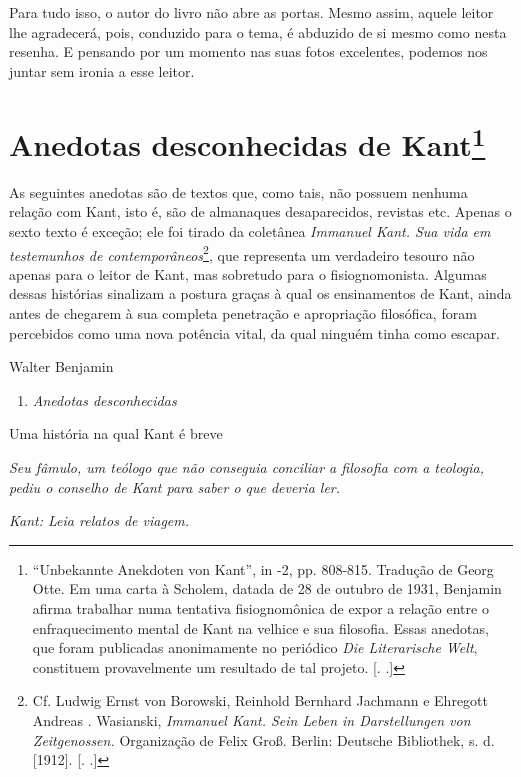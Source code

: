Para tudo isso, o autor do livro não abre as portas. Mesmo assim, aquele
leitor lhe agradecerá, pois, conduzido para o tema, é abduzido de si
mesmo como nesta resenha. E pensando por um momento nas suas fotos
excelentes, podemos nos juntar sem ironia a esse leitor.

\chapter{Anedotas desconhecidas de Kant\footnote[*]{``Unbekannte Anekdoten von
  Kant'', in  -2, pp. 808-815. Tradução de Georg Otte. Em uma carta
  à Scholem, datada de 28 de outubro de 1931, Benjamin afirma trabalhar
  numa tentativa fisiognomônica de expor a relação entre o
  enfraquecimento mental de Kant na velhice e sua filosofia. Essas
  anedotas, que foram publicadas anonimamente no periódico \emph{Die
  Literarische Welt}, constituem provavelmente um resultado de tal
  projeto. [. .]}}

As seguintes anedotas são de textos que, como tais, não possuem nenhuma
relação com Kant, isto é, são de almanaques desaparecidos, revistas etc.
Apenas o sexto texto é exceção; ele foi tirado da coletânea
\emph{Immanuel Kant. Sua vida em testemunhos de
contemporâneos}\footnote{Cf. Ludwig Ernst von Borowski, Reinhold
  Bernhard Jachmann e Ehregott Andreas . Wasianski, \emph{Immanuel
  Kant. Sein Leben in Darstellungen von Zeitgenossen.} Organização de
  Felix Groß. Berlin: Deutsche Bibliothek, s. d. [1912]. [. .]}, que representa um verdadeiro tesouro não apenas para o
leitor de Kant, mas sobretudo para o fisiognomonista. Algumas dessas
histórias sinalizam a postura graças à qual os ensinamentos de Kant,
ainda antes de chegarem à sua completa penetração e apropriação
filosófica, foram percebidos como uma nova potência vital, da qual
ninguém tinha como escapar.

Walter Benjamin

\begin{enumerate}
\def\labelenumi{\Roman{enumi}.}
\item
  \emph{Anedotas desconhecidas}
\end{enumerate}

Uma história na qual Kant é breve

\emph{Seu fâmulo, um teólogo que não conseguia conciliar a filosofia com
a teologia, pediu o conselho de Kant para saber o que deveria ler.}

\emph{Kant: Leia relatos de viagem.}

